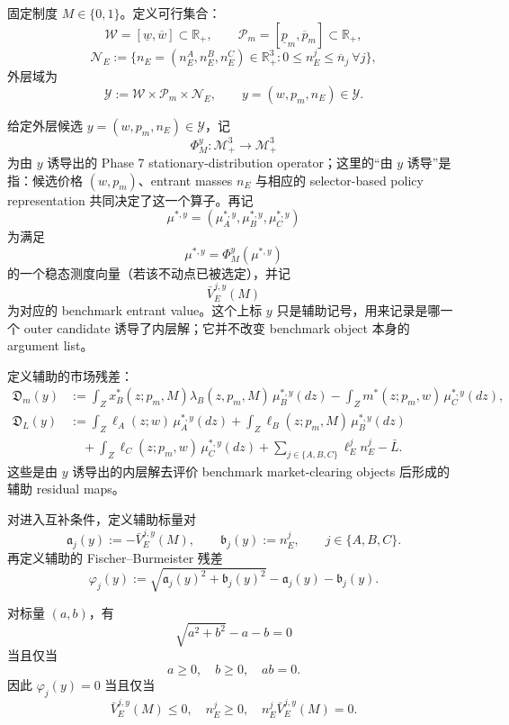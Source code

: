 固定制度 $M\in\{0,1\}$。定义可行集合：
\[
\mathcal W=[\underline w,\overline w]\subset\mathbb R_+,
\qquad
\mathcal P_m=[\underline p_m,\overline p_m]\subset\mathbb R_+,
\]
\[
\mathcal N_E:=\{n_E=(n_E^A,n_E^B,n_E^C)\in\mathbb R_+^3:0\le n_E^j\le\overline n_j\ \forall j\},
\]
外层域为
\[
\mathcal Y:=\mathcal W\times\mathcal P_m\times\mathcal N_E,
\qquad
y=(w,p_m,n_E)\in\mathcal Y.
\]

给定外层候选 $y=(w,p_m,n_E)\in\mathcal Y$，记
\[
\Phi_M^y:\mathcal M_+^3\to\mathcal M_+^3
\]
为由 $y$ 诱导出的 Phase 7 stationary-distribution operator；这里的“由 $y$ 诱导”是指：候选价格 $(w,p_m)$、entrant masses $n_E$ 与相应的 selector-based policy representation 共同决定了这一个算子。再记
\[
\mu^{*,y}=(\mu_A^{*,y},\mu_B^{*,y},\mu_C^{*,y})
\]
为满足
\[
\mu^{*,y}=\Phi_M^y(\mu^{*,y})
\]
的一个稳态测度向量（若该不动点已被选定），并记
\[
\bar V_E^{j,y}(M)
\]
为对应的 benchmark entrant value。这个上标 $y$ 只是辅助记号，用来记录是哪一个 outer candidate 诱导了内层解；它并不改变 benchmark object 本身的 argument list。

定义辅助的市场残差：
\begin{align}
\mathfrak D_m(y)
&:=
\int_Z x_B^*(z;p_m,M)\lambda_B(z,p_m,M)\,\mu_B^{*,y}(dz)
-
\int_Z m^*(z;p_m,w)\,\mu_C^{*,y}(dz),
\label{eq:p8zh_Dm_resid}\\
\mathfrak D_L(y)
&:=
\int_Z \ell_A(z;w)\,\mu_A^{*,y}(dz)
+\int_Z \ell_B(z;p_m,M)\,\mu_B^{*,y}(dz)
\nonumber\\
&\quad+\int_Z \ell_C(z;p_m,w)\,\mu_C^{*,y}(dz)
+\sum_{j\in\{A,B,C\}}\ell_E^j n_E^j
-\bar L.
\label{eq:p8zh_DL_resid}
\end{align}
这些是由 $y$ 诱导出的内层解去评价 benchmark market-clearing objects 后形成的辅助 residual maps。

对进入互补条件，定义辅助标量对
\[
\mathfrak a_j(y):=-\bar V_E^{j,y}(M),
\qquad
\mathfrak b_j(y):=n_E^j,
\qquad j\in\{A,B,C\}.
\]
再定义辅助的 Fischer--Burmeister 残差
\begin{equation}
\varphi_j(y):=\sqrt{\mathfrak a_j(y)^2+\mathfrak b_j(y)^2}-\mathfrak a_j(y)-\mathfrak b_j(y).
\label{eq:p8zh_fb}
\end{equation}

\begin{lemma}
对标量 $(a,b)$，有
\[
\sqrt{a^2+b^2}-a-b=0
\]
当且仅当
\[
a\ge0,\quad b\ge0,\quad ab=0.
\]
因此 $\varphi_j(y)=0$ 当且仅当
\[
\bar V_E^{j,y}(M)\le0,\quad n_E^j\ge0,\quad n_E^j\bar V_E^{j,y}(M)=0.
\]
\end{lemma}

